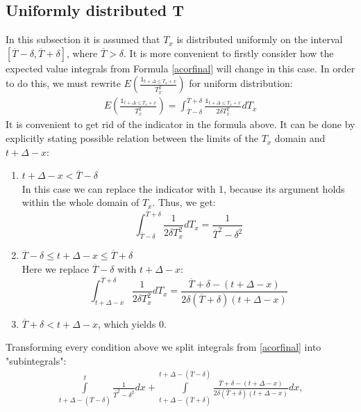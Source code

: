 \documentclass[12pt]{article}
\begin{document}
\subsection{Uniformly distributed T}
In this subsection it is assumed that $T_x$ is distributed uniformly on the interval $[\overline{T}-\delta,\overline{T}+\delta]$, where $\overline{T}>\delta$. It is more convenient to firstly consider how the expected value integrals from Formula \eqref{acorfinal} will change in this case. In order to do this, we must rewrite $E(\frac{\mathds{1}_{t+\Delta\leq T_x+x}}{T_x^2})$ for uniform distribution:
\begin{equation*}
\begin{gathered}
E\left(\frac{\mathds{1}_{t+\Delta\leq T_x+x}}{T_x^2}\right)=
\int_{\overline{T}-\delta}^{\overline{T}+\delta}\frac{\mathds{1}_{t+\Delta\leq T_x+x}}{2\delta T_x^2}dT_x
\end{gathered}
\end{equation*}
It is convenient to get rid of the indicator in the formula above. It can be done by explicitly stating possible relation between the limits of the $T_x$ domain and $t+\Delta-x$:
\begin{enumerate}
\item $t+\Delta-x<\overline{T}-\delta$\\
In this case we can replace the indicator with 1, because its argument holds within the whole domain of $T_x$. Thus, we get:
\begin{equation*}
\int_{\overline{T}-\delta}^{\overline{T}+\delta}\frac{1}{2\delta T_x^2}dT_x=\frac{1}{\overline{T}^2-\delta^2}
\end{equation*}
\item $\overline{T}-\delta\leq t+\Delta-x\leq\overline{T}+\delta$\\
Here we replace $\overline{T}-\delta$ with $t+\Delta-x$:
\begin{equation*}
\int_{t+\Delta-x}^{\overline{T}+\delta}\frac{1}{2\delta T_x^2}dT_x=\frac{\overline{T}+\delta-(t+\Delta-x)}{2\delta(\overline{T}+\delta)(t+\Delta-x)}
\end{equation*}
\item $\overline{T}+\delta<t+\Delta-x$, which yields 0.
\end{enumerate}
Transforming every condition above we split integrals from \eqref{acorfinal} into "subintegrals":
\begin{equation*}
\begin{gathered}
\int\limits^t_{t+\Delta-(\overline{T}-\delta)}\frac{1}{\overline{T}^2-\delta^2}dx+\int\limits^{t+\Delta-(\overline{T}-\delta)}_{t+\Delta-(\overline{T}+\delta)}\frac{\overline{T}+\delta-(t+\Delta-x)}{2\delta(\overline{T}+\delta)(t+\Delta-x)}dx,
\end{gathered}
\end{equation*}
\end{document}
